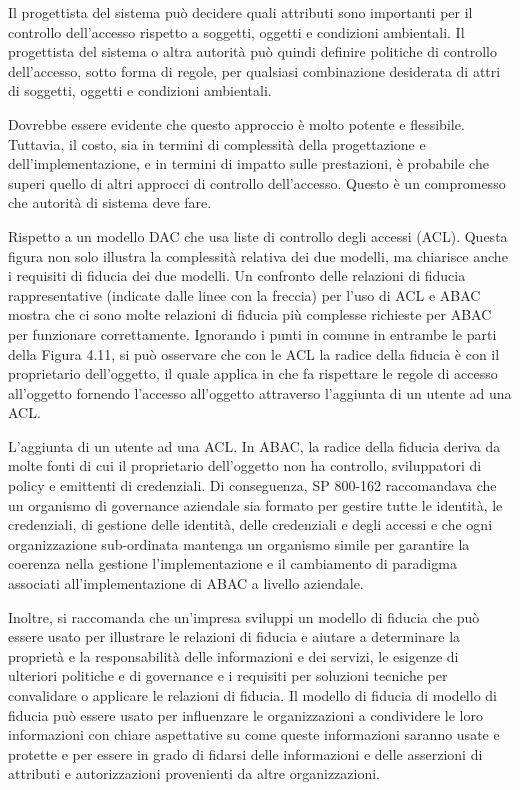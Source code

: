 Il progettista del sistema può decidere quali attributi sono importanti per il controllo dell'accesso rispetto a soggetti, oggetti e condizioni ambientali. Il progettista del sistema o altra autorità può quindi definire politiche di controllo dell'accesso, sotto forma di regole, per qualsiasi combinazione desiderata di attri di soggetti, oggetti e condizioni ambientali.

\singlespacing

Dovrebbe essere evidente che questo approccio è molto potente e flessibile. Tuttavia, il costo, sia in termini di complessità della progettazione e dell'implementazione, e in termini di impatto sulle prestazioni, è probabile che superi quello di altri approcci di controllo dell'accesso. Questo è un compromesso che autorità di sistema deve fare.

\singlespacing

Rispetto a un modello DAC che usa liste di controllo degli accessi (ACL). Questa figura non solo illustra la complessità relativa dei due modelli, ma chiarisce anche i requisiti di fiducia dei due modelli. Un confronto delle relazioni di fiducia rappresentative (indicate dalle linee con la freccia) per l'uso di ACL e ABAC mostra che ci sono molte relazioni di fiducia più complesse richieste per ABAC per funzionare correttamente. Ignorando i punti in comune in entrambe le parti della Figura 4.11, si può osservare che con le ACL la radice della fiducia è con il proprietario dell'oggetto, il quale applica in che fa rispettare le regole di accesso all'oggetto fornendo l'accesso all'oggetto attraverso l'aggiunta di un utente ad una ACL.

\singlespacing

L'aggiunta di un utente ad una ACL. In ABAC, la radice della fiducia deriva da molte fonti di cui il proprietario dell'oggetto non ha controllo, sviluppatori di policy e emittenti di credenziali. Di conseguenza, SP 800-162 raccomandava che un organismo di governance aziendale sia formato per gestire tutte le identità, le credenziali, di gestione delle identità, delle credenziali e degli accessi e che ogni organizzazione sub-ordinata mantenga un organismo simile per garantire la coerenza nella gestione l'implementazione e il cambiamento di paradigma associati all'implementazione di ABAC a livello aziendale.

\singlespacing

Inoltre, si raccomanda che un'impresa sviluppi un modello di fiducia che può essere usato per illustrare le relazioni di fiducia e aiutare a determinare la proprietà e la responsabilità delle informazioni e dei servizi, le esigenze di ulteriori politiche e di governance e i requisiti per soluzioni tecniche per convalidare o applicare le relazioni di fiducia. Il modello di fiducia di modello di fiducia può essere usato per influenzare le organizzazioni a condividere le loro informazioni con chiare aspettative su come queste informazioni saranno usate e protette e per essere in grado di fidarsi delle informazioni e delle asserzioni di attributi e autorizzazioni provenienti da altre organizzazioni.

